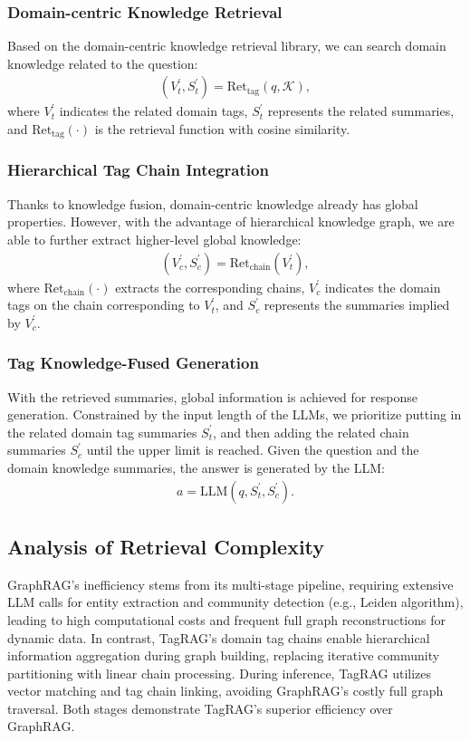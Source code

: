 \documentclass[11pt]{article}
\begin{document}
\subsubsection{Domain-centric Knowledge Retrieval}
Based on the domain-centric knowledge retrieval library, we can search domain knowledge related to the question:
\begin{align*}
    (V_t^{'}, S_t^{'}) = \text{Ret}_{\text{tag}}(q, \mathcal{K}),
\end{align*}
where $V_t^{'}$ indicates the related domain tags, $S_t^{'}$ represents the related summaries, and $\text{Ret}_{\text{tag}}(\cdot)$ is the retrieval function with cosine similarity.


\subsubsection{Hierarchical Tag Chain Integration}
Thanks to knowledge fusion, domain-centric knowledge already has global properties. 
However, with the advantage of hierarchical knowledge graph, we are able to further extract higher-level global knowledge:
\begin{align*}
    (V_c^{'}, S_c^{'}) = \text{Ret}_{\text{chain}}(V_t^{'}),
\end{align*}
where $\text{Ret}_{\text{chain}}(\cdot)$ extracts the corresponding chains, $V_c^{'}$ indicates the domain tags on the chain corresponding to $V_t^{'}$, and $S_c^{'}$ represents the summaries implied by $V_c^{'}$.


\subsubsection{Tag Knowledge-Fused Generation}
With the retrieved summaries, global information is achieved for response generation.
Constrained by the input length of the LLMs, we prioritize putting in the related domain tag summaries $S_t^{'}$, and then adding the related chain summaries $S_c^{'}$ until the upper limit is reached.
Given the question and the domain knowledge summaries, the answer is generated by the LLM:
\begin{align*}
    a = \text{LLM}(q, S_t^{'}, S_c^{'}).
\end{align*}
\vspace{-20pt}



\subsection{Analysis of Retrieval Complexity}
GraphRAG's inefficiency stems from its multi-stage pipeline, requiring extensive LLM calls for entity extraction and community detection (e.g., Leiden algorithm), leading to high computational costs and frequent full graph reconstructions for dynamic data. In contrast, TagRAG's domain tag chains enable hierarchical information aggregation during graph building, replacing iterative community partitioning with linear chain processing. During inference, TagRAG utilizes vector matching and tag chain linking, avoiding GraphRAG's costly full graph traversal. Both stages demonstrate TagRAG's superior efficiency over GraphRAG.
\end{document}
